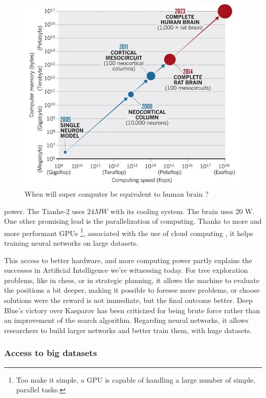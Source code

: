 \documentclass[12pt]{article}
\begin{document}
\begin{figure}[h]
    \centering
    \includegraphics[width=\textwidth]{fartogo}
    \caption{When will super computer be equivalent to human brain ?}
    \label{fig:fartogo}
\end{figure}

power. The Tianhe-2 uses $24MW$ with its cooling system. The brain uses 20 W.
One other promising lead is the parallelization of computing. Thanks to more and
more performant GPUs \footnote{Too make it simple, a GPU is capable of handling
a large number of simple, parallel tasks.}, associated  with  the use of cloud
computing \cite{cloud}, it helps training neural networks on large datasets.

This access to better hardware, and more computing power partly explains the
successes in Artificial Intelligence we're witnessing today. For tree
exploration problems, like in chess, or in strategic planning, it allows the
machine to evaluate the positions a bit deeper, making it possible to foresee
more problems, or choose solutions were the reward is not immediate, but the
final outcome better. Deep Blue's victory  over Kasparov has been criticized for
being brute force rather than an improvement of the search algorithm. Regarding
neural networks, it allows researchers to build larger networks and better train
them, with huge datasets.

\subsubsection{Access to big datasets}
\end{document}
